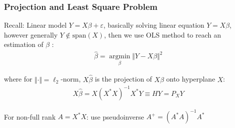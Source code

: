         
    
        

    






\subsubsection{Projection and Least Square Problem}
    Recall: Linear model $ Y=X\beta +\varepsilon  $, basically solving linear equation $ Y=X\beta  $, however generally $ Y\notin \mathrm{span}(X)  $, then we use OLS method to reach an estimation of $ \beta$    :
    \begin{align}
        \hat{\beta }=\mathop{\arg\min}\limits_{\beta }\Vert Y-X\beta  \Vert^2
    \end{align}
    
    where for $ \Vert \cdot \Vert = \ell_2 $-norm, $ X\hat{\beta } $ is the projection of $ X\beta  $ onto hyperplane $ X $:
    \begin{align}
        X\hat{\beta }= X(X^*X)^{-1}X^*Y\equiv HY=P_XY
    \end{align}

    For non-full rank $ A=X^*X $: use pseudoinverse $ A^+=(A^*A)^{-1}A^* $
    
    
    
